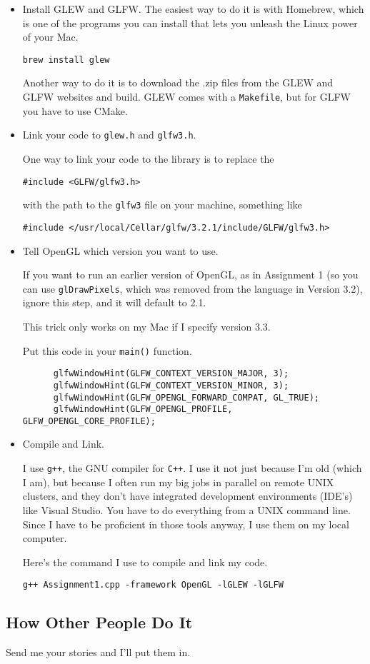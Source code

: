 \begin{itemize}
	\item Install GLEW and GLFW.  The easiest way to do it is with Homebrew, which is one of the programs you can install that lets you unleash the Linux power of your Mac.  
	
	{\tt brew install glew}
	
	Another way to do it is to download the .zip files from the GLEW and GLFW websites and build.  GLEW comes with a {\tt Makefile}, but for GLFW you have to use CMake.  
	
	\item Link your code to {\tt glew.h} and {\tt glfw3.h}.  
	
	One way to link your code to the library is to replace the 
	\begin{verbatim}#include <GLFW/glfw3.h>\end{verbatim}
	with the path to the {\tt glfw3} file on your machine, something like 
	\begin{verbatim}#include </usr/local/Cellar/glfw/3.2.1/include/GLFW/glfw3.h>\end{verbatim}
	
	\item Tell OpenGL which version you want to use.  
	
	If you want to run an earlier version of OpenGL, as in Assignment 1 (so you can use {\tt glDrawPixels}, which was removed from the language in Version 3.2), ignore this step, and it will default to 2.1.
	
	This trick only works on my Mac if I specify version 3.3.   
	
	Put this code in your {\tt main()} function.
	
\begin{verbatim}	
      glfwWindowHint(GLFW_CONTEXT_VERSION_MAJOR, 3);
      glfwWindowHint(GLFW_CONTEXT_VERSION_MINOR, 3);
      glfwWindowHint(GLFW_OPENGL_FORWARD_COMPAT, GL_TRUE);
      glfwWindowHint(GLFW_OPENGL_PROFILE, GLFW_OPENGL_CORE_PROFILE);	
 \end{verbatim}
 
 \item Compile and Link.  
 
 I use {\tt g++}, the GNU compiler for {\tt C++}.  I use it not just because I'm old (which I am), but because I often run my big jobs in parallel on remote UNIX clusters, and they don't have integrated development environments (IDE's) like Visual Studio.  You have to do everything from a UNIX command line.  Since I have to be proficient in those tools anyway, I use them on my local computer.  
 
 Here's the command I use to compile and link my code.  
 
 {\tt g++ Assignment1.cpp -framework OpenGL -lGLEW -lGLFW}
 
\end{itemize}

\subsection{How Other People Do It}
 
 Send me your stories and I'll put them in.  
 
